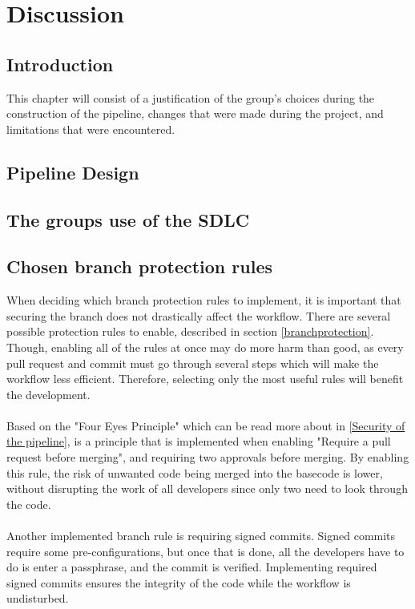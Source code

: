 \chapter{Discussion}
\section{Introduction}
This chapter will consist of a justification of the group's choices during the construction of the pipeline, changes that were made during the project, and limitations that were encountered.  

\section{Pipeline Design}

\section{The groups use of the SDLC} %


\section{Chosen branch protection rules}
When deciding which branch protection rules to implement, it is important that securing the branch does not drastically affect the workflow. There are several possible protection rules to enable, described in section \ref{branchprotection}. Though, enabling all of the rules at once may do more harm than good, as every pull request and commit must go through several steps which will make the workflow less efficient. Therefore, selecting only the most useful rules will benefit the development. 
\\~\\
Based on the "Four Eyes Principle" which can be read more about in \ref{Security of the pipeline}, is a principle that is implemented when enabling "Require a pull request before merging", and requiring two approvals before merging. By enabling this rule, the risk of unwanted code being merged into the basecode is lower, without disrupting the work of all developers since only two need to look through the code. \cite{foureyes} 
\\~\\
Another implemented branch rule is requiring signed commits. Signed commits require some pre-configurations, but once that is done, all the developers have to do is enter a passphrase, and the commit is verified. Implementing required signed commits ensures the integrity of the code while the workflow is undisturbed.




